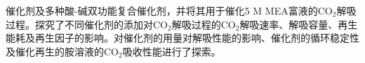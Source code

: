 ﻿\begin{conclusion}
催化剂及多种酸-碱双功能复合催化剂，并将其用于催化5 M MEA富液的$\text{CO}_2$解吸过程。探究了不同催化剂的添加对$\text{CO}_2$解吸过程的$\text{CO}_2$解吸速率、解吸容量、再生能耗及再生因子的影响。对催化剂的用量对解吸性能的影响、催化剂的循环稳定性及催化再生的胺溶液的$\text{CO}_2$吸收性能进行了探索。
\end{conclusion}

